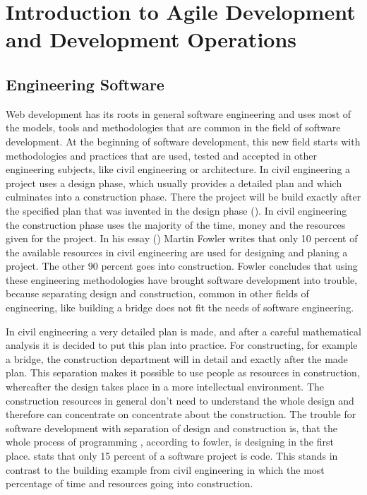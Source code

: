 \newpage

\section{Introduction to Agile Development and Development Operations}
\label{section:Introduction to Agile Development and Development Operations}

\subsection{Engineering Software}
Web development has its roots in general software engineering and uses most of the models, tools and methodologies that are
common in the field of software development. At the beginning of software development, this new field starts with methodologies
and practices that are used, tested and accepted in other engineering subjects, like civil engineering or architecture. In civil engineering
a project uses a design phase, which usually provides a detailed plan and which culminates into a construction phase. There the project
will be build exactly after the specified plan that was invented in the design phase (\cite{lindstrom2004extreme}).
In civil engineering the construction phase uses the majority of the time, money and the resources given for the project.
In his essay (\cite{fowler2001new}) Martin Fowler writes that only 10 percent of the available resources in civil engineering are used for
designing and planing a project. The other 90 percent goes into construction. Fowler concludes that using these engineering methodologies have
brought software development into trouble, because separating design and construction, common in other fields of engineering, like building
a bridge does not fit the needs of software engineering.

In civil engineering a very detailed plan is made, and after a careful mathematical analysis it is decided to put this plan into practice. For constructing,
for example a bridge, the construction department will in detail and exactly after the made plan.
This separation makes it possible to use people as resources in construction, whereafter the design takes place in a more
intellectual environment. The construction resources in general don't need to understand the whole design and therefore can concentrate on
concentrate about the construction. The trouble for software development with separation of design and construction is, that the whole process of programming
, according to fowler, is designing in the first place. \cite{opac-b1105529} stats that only 15 percent of a software project is code.
This stands in contrast to the building example from civil engineering in which the most percentage of time and resources going into construction.

